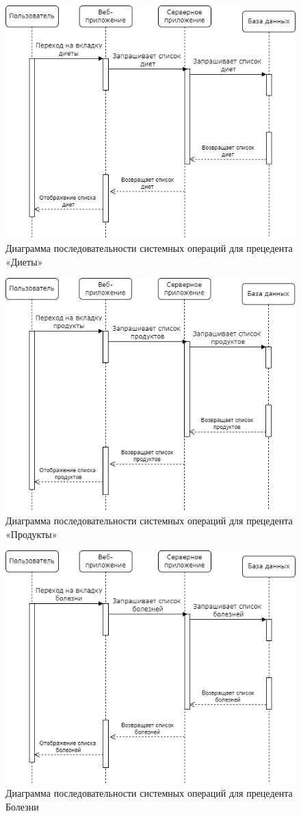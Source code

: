 \begin{figure}[H]
	\centering
	\includegraphics[width=0.7\linewidth]{"images/Диаграмма последовательности системных операций для прецедента «Диеты».drawio"}
	\caption{Диаграмма последовательности системных операций для прецедента «Диеты»}
	\label{fig:diagrammDiet}
\end{figure}

\begin{figure}[H]
	\centering
	\includegraphics[width=0.7\linewidth]{"images/Диаграмма последовательности системных операций для прецедента «Продукты».drawio"}
	\caption{Диаграмма последовательности системных операций для прецедента «Продукты»}
	\label{fig:diagrammProduct}
\end{figure}

\begin{figure}[H]
	\centering
	\includegraphics[width=0.7\linewidth]{"images/Диаграмма последовательности системных операций для прецедента Болезни.drawio"}
	\caption{Диаграмма последовательности системных операций для прецедента Болезни}
	\label{fig:diagrammDiseases}
\end{figure}

